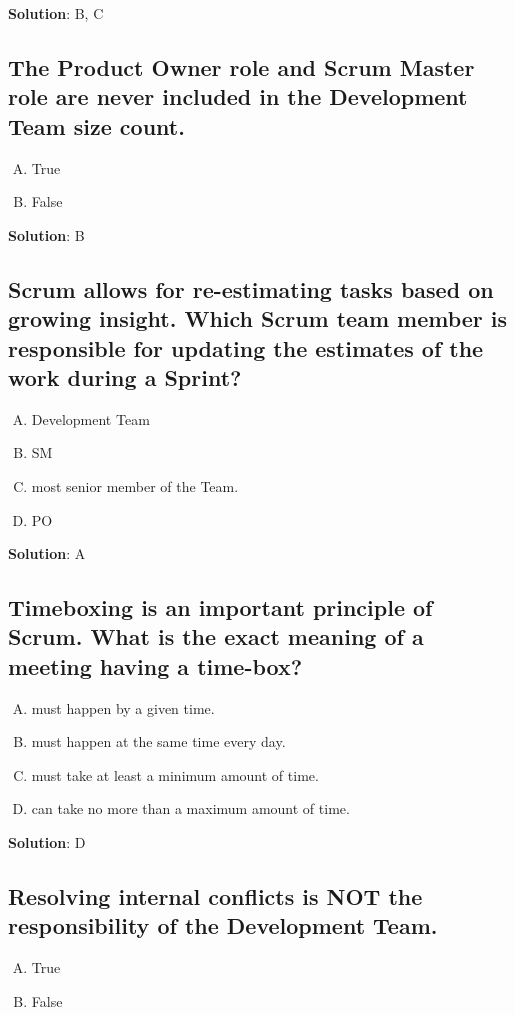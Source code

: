 \textbf{Solution}: B, C


\subsection{The Product Owner role and Scrum Master role are never included in the Development Team size count.}
\begin{enumerate}[A)]
  \item True
  \item False
\end{enumerate}


\textbf{Solution}: B


\subsection{Scrum allows for re-estimating tasks based on growing insight. Which Scrum team member is responsible for updating the estimates of the work during a Sprint?}
\begin{enumerate}[A)]
  \item Development Team
  \item SM
  \item most senior member of the Team.
  \item PO
\end{enumerate}

\textbf{Solution}: A


\subsection{Timeboxing is an important principle of Scrum. What is the exact meaning of a meeting having a time-box?}
\begin{enumerate}[A)]
  \item must happen by a given time.
  \item must happen at the same time every day.
  \item must take at least a minimum amount of time.
  \item can take no more than a maximum amount of time.
\end{enumerate}

\textbf{Solution}: D


\subsection{Resolving internal conflicts is NOT the responsibility of the Development Team.}
\begin{enumerate}[A)]
  \item True
  \item False
\end{enumerate}


